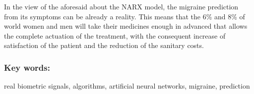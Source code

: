 In the view of the aforesaid about the NARX model, the migraine prediction from its symptoms can be already a reality. This means that the 6\% and 8\% of world women and men will take their medicines enough in advanced that allows the complete actuation of the treatment, with the consequent increase of satisfaction of the patient and the reduction of the sanitary costs.


\vspace*{0.5cm} 


\subsubsection*{Key  words:} real biometric signals, algorithms, artificial neural networks, migraine, prediction 
 
\clearpage 
\thispagestyle{empty}

